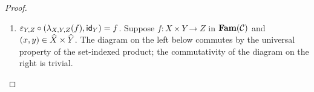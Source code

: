 \begin{proof}
\begin{enumerate}
To show $\lambda_{X,Y,Z}(f^\dagger, g^\dagger) = (f,g)$, suppose $\lambda_{X,Y,Z}(f^\dagger, g^\dagger) = (f',
g')$. Then:
\begin{itemize}
\item $f'(x) = (f^\dagger \comp (x, -), \reindex{g^\dagger}{(x,-)} \comp \biinj_{\faml{Y}}): Y \to Z$ where
$\biinj_{\faml{Y}}: \faml{Y} \to \const_{\idx{Y}}(\faml{X}_x) \biprod \faml{Y}$
\item $g'_x = \lambda_{\prod_{\idx{Y}}}(\reindex{g^\dagger}{(x,-)} \comp \biinj_{\faml{X}_x}:
\const_{\idx{Y}}(\faml{X}_x) \to \reindex{\faml{Z}}{f^\dagger})$ where $\biinj_{\faml{X}_x}:
\const_{\idx{Y}}(\faml{X}_x) \to \const_{\idx{Y}}(\faml{X}_x) \biprod \faml{Y}$.
\end{itemize}
\noindent To show $f' = f : \idx{X} \to \Fam(\cat{C})(Y,Z)$, suppose $x \in \idx{X}$ and show $f'(x) = f(x): Y
\to Z$. Suppose $y \in \idx{Y}$.
\begin{enumerate}
\item $\idx{f'(x)}(y) = (f^\dagger \comp (x, -))(y) = f^\dagger(x,y) = \idx{f(x)}(y)$.
\item $\faml{f'(x)}_y = (\reindex{g^\dagger}{(x,-)} \comp \biinj_{\faml{Y}})_y = \reindex{g^\dagger}{(x,-)}_y \comp
{\biinj_{\faml{Y}}}_y = g^\dagger_{x,y} \comp {\biinj_{\faml{Y}}}_y = \coprodM{{\eval_{\prod}}_y \comp
g_x}{\faml{f(x)}_y} \comp {\biinj_{\faml{Y}}}_y = \faml{f(x)}_y$.
\end{enumerate}

To show $g' = g$, suppose $x \in \idx{X}$.
\begin{align*}
\small
g'_x
&=
\lambda_{\prod_{\idx{Y}}}(\reindex{g^\dagger}{(x,-)} \comp \biinj_{\faml{X}_x}) \\
&=
\lambda_{\prod_{\idx{Y}}}(\{g^\dagger_{(x,y)} \comp (\biinj_{\faml{X}_x})_y\}_{y \in \idx{Y}}) \\
&=
\lambda_{\prod_{\idx{Y}}}(\{\coprodM{{\eval_{\prod}}_y \comp g_x}{\faml{f(x)}_y} \comp (\biinj_{\faml{X}_x})_y\}_{y \in \idx{Y}}) \\
&=
\lambda_{\prod_{\idx{Y}}}(\{{\eval_{\prod}}_y \comp g_x\}_{y \in \idx{Y}}) \\
&=
g_x
\end{align*}
\qed

\item $\varepsilon_{Y,Z} \circ (\lambda_{X,Y,Z}(f), \mathsf{id}_{Y}) = f$. Suppose $f: X \times Y \to Z$ in $\mathbf{Fam}(\mathcal{C})$
and $(x, y) \in \widehat{X} \times \widehat{Y}$. The diagram on the left below commutes by the universal property of
the set-indexed product; the commutativity of the diagram on the right is trivial.


\end{enumerate}
\end{proof}
